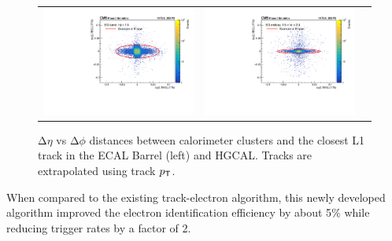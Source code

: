  \begin{figure}[tbh!]
 \begin{center}
  \begin{tabular}{ccc}
   \includegraphics[width=.45\linewidth]{figures/Part2/Upgrade/DR_barrel}&
   \includegraphics[width=.45\linewidth]{figures/Part2/Upgrade/DR_endcap}&
  \end{tabular}
  \caption{$\mathrm{\Delta}\eta$ vs $\mathrm{\Delta}\phi$ distances between calorimeter clusters and the closest \ac{L1} track in the \ac{ECAL} Barrel (left) and \ac{HGCAL}. Tracks are extrapolated using track $p_{\textsf{T}}$.}
 \label{fig:electron}
 \end{center}
\end{figure}

When compared to the existing track-electron algorithm, this newly developed algorithm improved the electron identification efficiency by about 5$\%$ while reducing trigger rates by a factor of 2.

